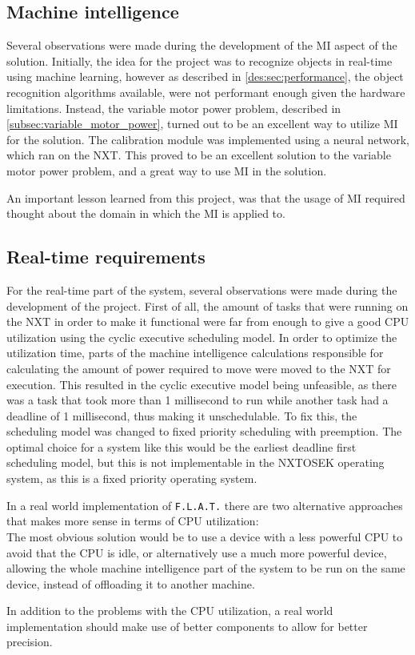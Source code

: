 \subsection{Machine intelligence}
Several observations were made during the development of the MI aspect of the solution.
Initially, the idea for the project was to recognize objects in real-time using machine learning, however as described in \autoref{des:sec:performance}, the object recognition algorithms available, were not performant enough given the hardware limitations.
Instead, the variable motor power problem, described in \autoref{subsec:variable_motor_power}, turned out to be an excellent way to utilize MI for the solution.
The calibration module was implemented using a neural network, which ran on the NXT.
This proved to be an excellent solution to the variable motor power problem, and a great way to use MI in the solution.

An important lesson learned from this project, was that the usage of MI required thought about the domain in which the MI is applied to.


\subsection{Real-time requirements}
For the real-time part of the system, several observations were made during the development of the project.
First of all, the amount of tasks that were running on the NXT in order to make it functional were far from enough to give a good CPU utilization using the cyclic executive scheduling model.
In order to optimize the utilization time, parts of the machine intelligence calculations responsible for calculating the amount of power required to move were moved to the NXT for execution.
This resulted in the cyclic executive model being unfeasible, as there was a task that took more than 1 millisecond to run while another task had a deadline of 1 millisecond, thus making it unschedulable. 
To fix this, the scheduling model was changed to fixed priority scheduling with preemption.
The optimal choice for a system like this would be the earliest deadline first scheduling model, but this is not implementable in the NXTOSEK operating system, as this is a fixed priority operating system.

In a real world implementation of \texttt{F.L.A.T.} there are two alternative approaches that makes more sense in terms of CPU utilization: \\
The most obvious solution would be to use a device with a less powerful CPU to avoid that the CPU is idle, or alternatively use a much more powerful device, allowing the whole machine intelligence part of the system to be run on the same device, instead of offloading it to another machine.

In addition to the problems with the CPU utilization, a real world implementation should make use of better components to allow for better precision.